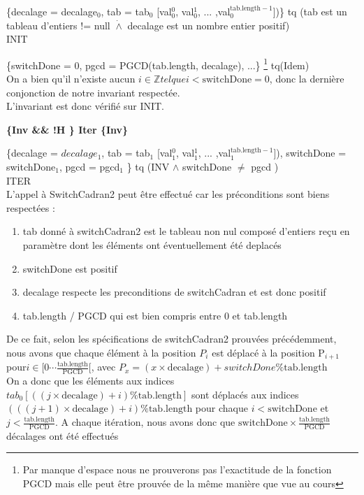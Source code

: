 \{decalage = decalage$_{0}$, tab = tab$_{0}$ [val$_{0}^{0}$, val$_{0}^{1}$, ... ,val$_{0}^{\mathrm{tab.length}-1}$])\} tq (tab est un tableau d'entiers != null
$\dot{\wedge}$ decalage est un nombre entier positif)\\

INIT

\{switchDone = 0, pgcd = PGCD(tab.length, decalage), ...\} \footnote{Par manque d'espace nous ne prouverons pas l'exactitude de la fonction PGCD mais elle peut être prouvée de la même manière que vue au cours} tq(Idem)\\

On a bien qu'il n'existe aucun $i \in \mathbb{Z} tel que i< \mathrm{switchDone} = 0$, donc la dernière conjonction de notre invariant respectée. \\

L'invariant est donc vérifié sur INIT.

\textbf{\{Inv \&\& !H \} Iter \{Inv\}}

\{decalage = $decalage_{1}$, tab = tab$_{1}$ [val$_{1}^{0}$, val$_{1}^{1}$, ... ,val$_{1}^{\mathrm{tab.length-1}}$]), switchDone = switchDone$_{1}$, pgcd = pgcd$_{1}$ \} tq (INV $\wedge$ switchDone $\neq$ pgcd )\\

ITER \\

L'appel à SwitchCadran2 peut être effectué car les préconditions sont biens respectées :
\begin{enumerate}
 \item tab donné à switchCadran2 est le tableau non nul composé d'entiers reçu en paramètre dont les éléments ont éventuellement été deplacés
 \item switchDone est positif
 \item decalage respecte les preconditions de switchCadran et est donc positif
 \item tab.length / PGCD qui est bien compris entre 0 et tab.length
\end{enumerate}


De ce fait, selon les spécifications de switchCadran2 prouvées précédemment, nous avons
que chaque élément à la position $P_{i}$  est déplacé à la position P$_{i+1}$ pour$ i \in [0\cdots
    \frac{\mathrm{tab.length}}{\mathrm{PGCD}}[$, avec $P_{x} = (x\times \mathrm{decalage})+switchDone \% \mathrm{tab.length}$\\

On a donc que les éléments aux indices $tab_{0}[((j \times \mathrm{decalage}) + i) \% \mathrm{tab.length}]$ sont déplacés aux indices $(((j+1)\times \mathrm{decalage})+i) \% \mathrm{tab.length}$ pour chaque $i < \mathrm{switchDone}$ et $j < \frac{\mathrm{tab.length}}{\mathrm{PGCD}}$.
A chaque itération, nous avons donc que $\mathrm{switchDone} \times \frac {\mathrm{tab.length}}{\mathrm{PGCD}}$ décalages ont été effectués\\

